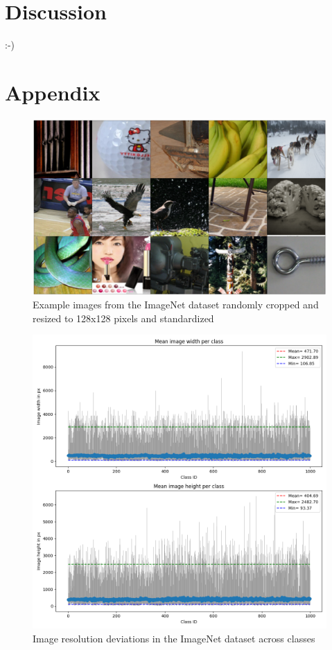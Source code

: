 \documentclass[10pt,a4paper,twoside]{article}
\begin{document}
\section{Discussion}
:-)



\section{Appendix}

\begin{figure}
    \centering
    \includegraphics[width=\textwidth]{../../sample_images/imagenet_unnormalized.png}
    \caption{Example images from the ImageNet dataset randomly cropped and resized to 128x128 pixels and standardized}
    \label{fig:imnet_example_normalized}
\end{figure}

\begin{figure}
    \centering
    \includegraphics[width=\textwidth]{../../sample_images/imagenet_sizes_errorbar.png}
    \caption{Image resolution deviations in the ImageNet dataset across classes}
    \label{fig:imnet_sizes_err}
\end{figure}
\end{document}
